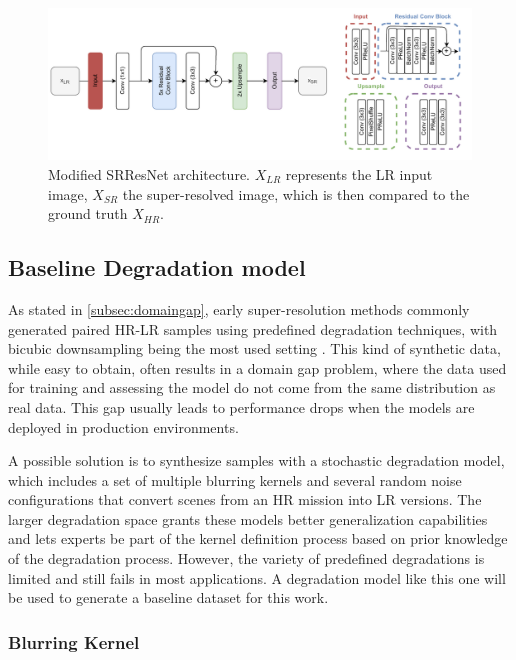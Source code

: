     \begin{figure}[H]
        \centering
        \includegraphics[width=1\textwidth]{Includes/3-srresnet-architecture.pdf}
        \caption{ Modified SRResNet architecture. $X_{LR}$ represents the LR input image, $X_{SR}$ the super-resolved image, which is then compared to the ground truth $X_{HR}$.}
        \label{fig:3-resnet-architecture}
     \end{figure}
    
    \subsection{Baseline Degradation model} \label{subsec:baseline_degradation_model}

        As stated in \ref{subsec:domaingap}, early super-resolution methods commonly generated paired HR-LR samples using predefined degradation techniques, with bicubic downsampling being the most used setting \cite{zhang2018residual}.
        This kind of synthetic data, while easy to obtain, often results in a domain gap problem, where the data used for training and assessing the model do not come from the same distribution as real data. This gap usually leads to performance drops when the models are deployed in production environments.
        
        A possible solution is to synthesize samples with a stochastic degradation model, which includes a set of multiple blurring kernels and several random noise configurations that convert scenes from an HR mission into LR versions.
        The larger degradation space grants these models better generalization capabilities and lets experts be part of the kernel definition process based on prior knowledge of the degradation process.
        However, the variety of predefined degradations is limited and still fails in most applications. A degradation model like this one will be used to generate a baseline dataset for this work.
        

        \subsubsection{Blurring Kernel}

